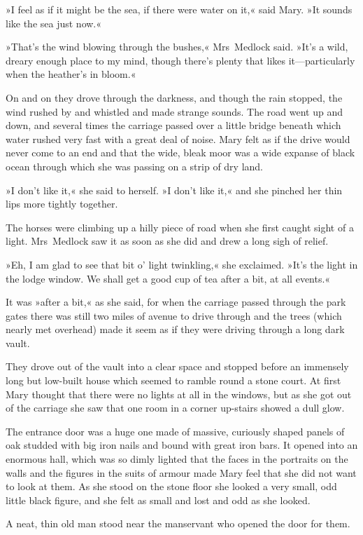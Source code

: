 »I feel as if it might be the sea, if there were water on it,« said Mary. »It sounds like the sea just now.«

»That's the wind blowing through the bushes,« Mrs~Medlock said. »It's a wild, dreary enough place to my mind, though there's plenty that likes it—particularly when the heather's in bloom.«

On and on they drove through the darkness, and though the rain stopped, the wind rushed by and whistled and made strange sounds. The road went up and down, and several times the carriage passed over a little bridge beneath which water rushed very fast with a great deal of noise. Mary felt as if the drive would never come to an end and that the wide, bleak moor was a wide expanse of black ocean through which she was passing on a strip of dry land.

»I don't like it,« she said to herself. »I don't like it,« and she pinched her thin lips more tightly together.

The horses were climbing up a hilly piece of road when she first caught sight of a light. Mrs~Medlock saw it as soon as she did and drew a long sigh of relief.

»Eh, I am glad to see that bit o' light twinkling,« she exclaimed. »It's the light in the lodge window. We shall get a good cup of tea after a bit, at all events.«

It was »after a bit,« as she said, for when the carriage passed through the park gates there was still two miles of avenue to drive through and the trees (which nearly met overhead) made it seem as if they were driving through a long dark vault.

They drove out of the vault into a clear space and stopped before an immensely long but low-built house which seemed to ramble round a stone court. At first Mary thought that there were no lights at all in the windows, but as she got out of the carriage she saw that one room in a corner up-stairs showed a dull glow.

The entrance door was a huge one made of massive, curiously shaped panels of oak studded with big iron nails and bound with great iron bars. It opened into an enormous hall, which was so dimly lighted that the faces in the portraits on the walls and the figures in the suits of armour made Mary feel that she did not want to look at them. As she stood on the stone floor she looked a very small, odd little black figure, and she felt as small and lost and odd as she looked.

A neat, thin old man stood near the manservant who opened the door for them.


